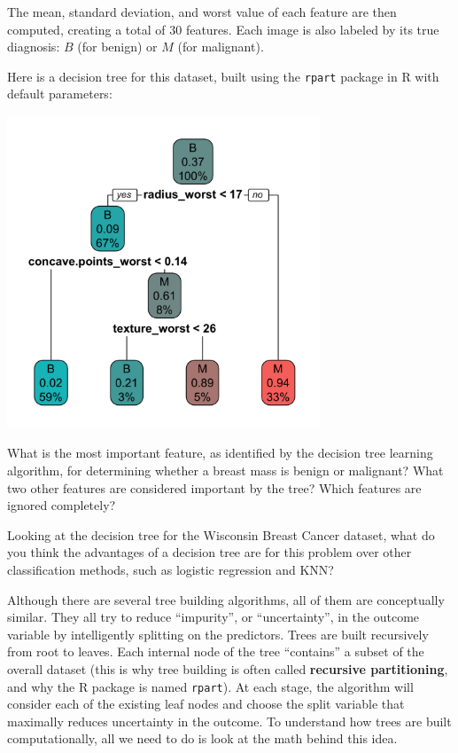 The mean, standard deviation, and worst value of each feature are then computed, creating a total of $30$ features. Each image is also labeled by its true diagnosis: $B$ (for benign) or $M$ (for malignant).

Here is a decision tree for this dataset, built using the \texttt{rpart} package in R with default parameters:
\begin{center}
\includegraphics[width=0.7\textwidth]{img/wisconsin-decision-tree.png}
\end{center}

\begin{question}{}
What is the most important feature, as identified by the decision tree learning algorithm, for determining whether a breast mass is benign or malignant? What two other features are considered important by the tree? Which features are ignored completely?
\end{question}

\begin{question}{}
Looking at the decision tree for the Wisconsin Breast Cancer dataset, what do you think the advantages of a decision tree are for this problem over other classification methods, such as logistic regression and KNN?
\end{question}

Although there are several tree building algorithms, all of them are conceptually similar. They all try to reduce ``impurity'', or ``uncertainty'', in the outcome variable by intelligently splitting on the predictors. Trees are built recursively from root to leaves. Each internal node of the tree ``contains'' a subset of the overall dataset (this is why tree building is often called \textbf{recursive partitioning}, and why the R package is named \texttt{rpart}). At each stage, the algorithm will consider each of the existing leaf nodes and choose the split variable that maximally reduces uncertainty in the outcome. To understand how trees are built computationally, all we need to do is look at the math behind this idea. 

